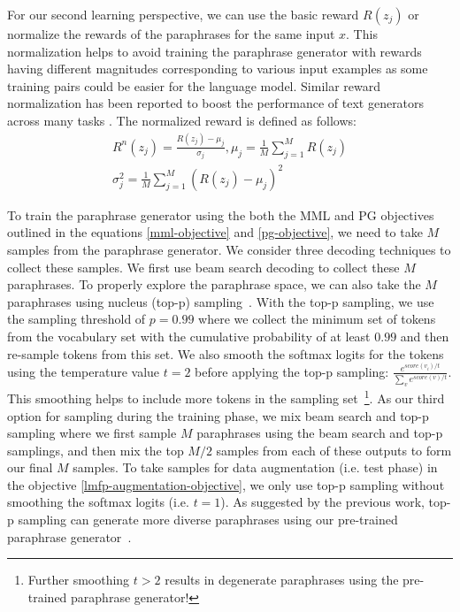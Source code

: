 \documentclass[11pt]{article}
\begin{document}
For our second learning perspective, we can use the basic reward $R(z_{j})$ or normalize the rewards of the paraphrases for the same input $x$. This normalization helps to avoid training the paraphrase generator with rewards having different magnitudes corresponding to various input examples as some training pairs could be easier for the language model. Similar reward normalization has been reported to boost the performance of text generators across many tasks \cite{guo-etal-2022-efficient}. The normalized reward is defined as follows:
\begin{multline}
R^{n}(z_{j}) = \frac{R(z_{j}) - \mu_{j}}{\sigma_{j}}, \mu_{j} = \frac{1}{M} \sum^{M}_{j=1} R(z_{j}) \\
\sigma^{2}_{j} = \frac{1}{M} \sum^{M}_{j=1} (R(z_{j}) - \mu_{j})^2
\label{normal-reward}
\end{multline}

To train the paraphrase generator using the both the MML and PG objectives outlined in the equations \ref{mml-objective} and \ref{pg-objective}, we need to take $M$ samples from the paraphrase generator. We consider three decoding techniques to collect these samples. We first use beam search decoding to collect these $M$ paraphrases. To properly explore the paraphrase space, we can also take the $M$ paraphrases using nucleus (top-p) sampling~\cite{holtzman2020curious}. With the top-p sampling, we use the sampling threshold of $p=0.99$ where we collect the minimum set of tokens from the vocabulary set with the cumulative probability of at least $0.99$ and then re-sample tokens from this set. We also smooth the softmax logits for the tokens using the temperature value $t=2$ before applying the top-p sampling: $\frac{e^{score(v_i)/t}}{\sum_{v} e^{score(v)/t}}$. This smoothing helps to include more tokens in the sampling set~\footnote{Further smoothing $t>2$ results in degenerate paraphrases using the pre-trained paraphrase generator!}. As our third option for sampling during the training phase, we mix beam search and top-p sampling where we first sample $M$ paraphrases using the beam search and top-p samplings, and then mix the top $M/2$ samples from each of these outputs to form our final $M$ samples. To take samples for data augmentation (i.e. test phase) in the objective \ref{lmfp-augmentation-objective}, we only use top-p sampling without smoothing the softmax logits (i.e. $t=1$). As suggested by the previous work, top-p sampling can generate more diverse paraphrases using our pre-trained paraphrase generator~\cite{xu-etal-2020-autoqa}.
\end{document}
